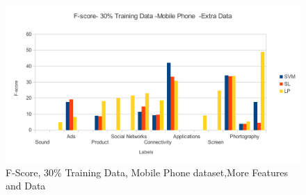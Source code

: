 \documentclass[4pt,a4paper,twocolumn]{article}
\begin{document}
\begin{figure}[]
  
  \centering
    \includegraphics[scale=0.7]{graphics/sony/moreData/fscore-30-sony}
    \caption{F-Score, 30\% Training Data, Mobile Phone dataset,More Features and Data}
   \label{fig:sony_30_fscore_more}  
\end{figure}
\end{document}
